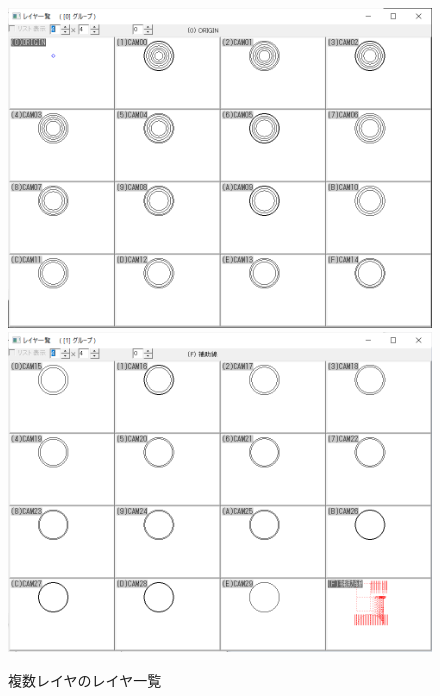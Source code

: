 \begin{figure}[H]
\centering
\includegraphics[scale=0.7]{No3/fig/25d-1.png}\\[2zh]
\includegraphics[scale=0.7]{No3/fig/25d-2.png}
\caption{複数レイヤのレイヤ一覧}
\label{fig:25d.png}
\end{figure}

